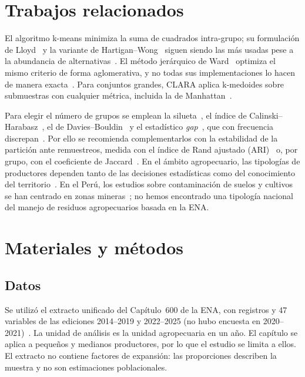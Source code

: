 \documentclass[10pt,twocolumn,a4paper]{article}
\begin{document}
\section{Trabajos relacionados}
El algoritmo k-means minimiza la suma de cuadrados intra-grupo; su formulación de Lloyd~\cite{lloyd1982} y la variante de Hartigan--Wong~\cite{hartigan1979} siguen siendo las más usadas pese a la abundancia de alternativas~\cite{jain2010}. El método jerárquico de Ward~\cite{ward1963} optimiza el mismo criterio de forma aglomerativa, y no todas sus implementaciones lo hacen de manera exacta~\cite{murtagh2014}. Para conjuntos grandes, CLARA aplica k-medoides sobre submuestras con cualquier métrica, incluida la de Manhattan~\cite{kaufman1990}.

Para elegir el número de grupos se emplean la silueta~\cite{rousseeuw1987}, el índice de Calinski--Harabasz~\cite{calinski1974}, el de Davies--Bouldin~\cite{davies1979} y el estadístico \textit{gap}~\cite{tibshirani2001}, que con frecuencia discrepan~\cite{jain2010}. Por ello se recomienda complementarlos con la estabilidad de la partición ante remuestreos, medida con el índice de Rand ajustado (ARI)~\cite{hubert1985} o, por grupo, con el coeficiente de Jaccard~\cite{hennig2007}. En el ámbito agropecuario, las tipologías de productores dependen tanto de las decisiones estadísticas como del conocimiento del territorio~\cite{alvarez2018}. En el Perú, los estudios sobre contaminación de suelos y cultivos se han centrado en zonas mineras~\cite{bedoya2023}; no hemos encontrado una tipología nacional del manejo de residuos agropecuarios basada en la ENA.

\section{Materiales y métodos}

\subsection{Datos}
Se utilizó el extracto unificado del Capítulo~600 de la ENA, con \nRaw{} registros y 47 variables de las ediciones 2014--2019 y 2022--2025 (no hubo encuesta en 2020--2021)~\cite{inei_ena}. La unidad de análisis es la unidad agropecuaria en un año. El capítulo se aplica a pequeños y medianos productores, por lo que el estudio se limita a ellos. El extracto no contiene factores de expansión: las proporciones describen la muestra y no son estimaciones poblacionales.
\end{document}
